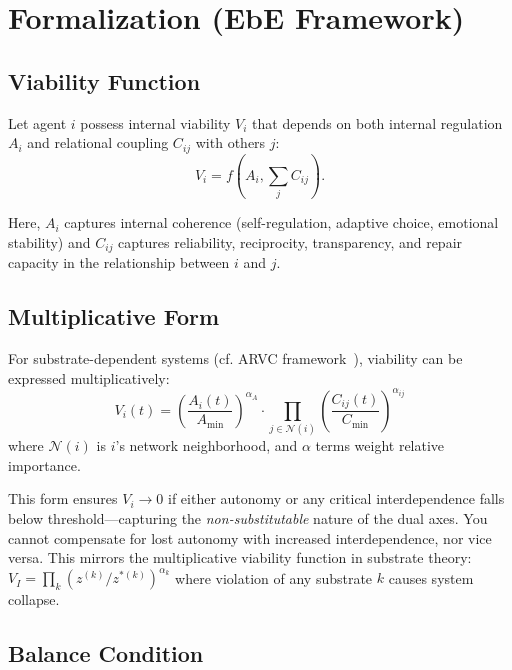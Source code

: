\documentclass[11pt,a4paper]{article}
\begin{document}
\section{Formalization (EbE Framework)}

\subsection{Viability Function}

Let agent $i$ possess internal viability $V_i$ that depends on both internal regulation $A_i$ and relational coupling $C_{ij}$ with others $j$:
\begin{equation}
  V_i = f\!\left(A_i, \sum_{j} C_{ij}\right).
  \label{eq:viability-basic}
\end{equation}

Here, $A_i$ captures internal coherence (self-regulation, adaptive choice, emotional stability) and $C_{ij}$ captures reliability, reciprocity, transparency, and repair capacity in the relationship between $i$ and $j$.

\subsection{Multiplicative Form}

For substrate-dependent systems (cf. ARVC framework~\cite{arvc}), viability can be expressed multiplicatively:
\begin{equation}
  V_i(t) = \left(\frac{A_i(t)}{A_{\min}}\right)^{\alpha_A} \cdot \prod_{j \in \mathcal{N}(i)} \left(\frac{C_{ij}(t)}{C_{\min}}\right)^{\alpha_{ij}}
  \label{eq:viability-multiplicative}
\end{equation}
where $\mathcal{N}(i)$ is $i$'s network neighborhood, and $\alpha$ terms weight relative importance. 

This form ensures $V_i \to 0$ if either autonomy or any critical interdependence falls below threshold---capturing the \emph{non-substitutable} nature of the dual axes. You cannot compensate for lost autonomy with increased interdependence, nor vice versa. This mirrors the multiplicative viability function in substrate theory: $V_I = \prod_k (z^{(k)}/z^{*(k)})^{\alpha_k}$ where violation of any substrate $k$ causes system collapse.

\subsection{Balance Condition}
\end{document}
